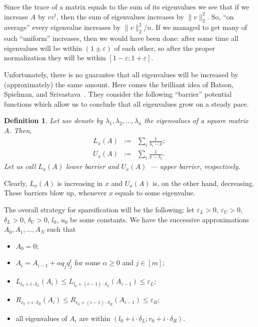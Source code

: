 \documentclass[12pt]{article}
\newcommand{\eps}{\varepsilon}
\newtheorem{definition}{Definition}
\begin{document}
    Since the trace of a matrix equals to the sum of its eigenvalues we see that if
    we increase $A$ by $vv^t$, then the sum of eigenvalues increases by $\|v\|_2^2$.
    So, ``on average'' every eigenvalue increases by $\|v\|_2^2 / n$.
    If we managed to get many of such ``uniform'' increases, then we would have been done:
    after some time all eigenvalues will be within $(1 \pm \eps)$ of each other, so after
    the proper normalization they will be within $[1 - \eps; 1 + \eps]$.

    Unfortunately, there is no guarantee that all eigenvalues will be increased by
    (approximately) the same amount.
    Here comes the brilliant idea of Batson, Spielman, and Srivastava~\cite{BSS09}.
    They consider the following ``barrier'' potential functions which allow us to conclude
    that all eigenvalues grow on a steady pace.

    \begin{definition}
        Let use denote by $\lambda_1, \lambda_2, \ldots, \lambda_n$ the eigenvalues of
        a square matrix $A$. Then,
        \begin{eqnarray*}
            L_{x}(A) &:=& \sum_{i} \frac{1}{\lambda_i - x}; \\
            U_{x}(A) &:=& \sum_{i} \frac{1}{x - \lambda_i}.
        \end{eqnarray*}
        Let us call $L_x(A)$ \emph{lower barrier} and $U_x(A)$~--- upper barrier,
        respectively.
    \end{definition}

    Clearly, $L_x(A)$ is increasing in $x$ and $U_x(A)$ is, on the other hand, decreasing.
    These barriers blow up, whenever $x$ equals to some eigenvalue.

    The overall strategy for sparsification will be the following:
    let $\eps_L > 0$, $\eps_U > 0$, $\delta_L > 0$, $\delta_U > 0$, $l_0$, $u_0$ be some
    constants. We have the successive approximations $A_0, A_1, \ldots, A_N$ such that
    \begin{itemize}
        \item $A_0 = 0$;
        \item $A_i = A_{i-1} + \alpha q_j q_j^t$ for some $\alpha \geq 0$ and $j \in [m]$;
        \item $L_{l_0 + i \cdot \delta_L}(A_i) \leq L_{l_0 +
            (i - 1) \cdot \delta_L}(A_{i-1})
              \leq \eps_L$;
        \item $R_{r_0 + i \cdot \delta_R}(A_i) \leq R_{r_0 +
            (i - 1) \cdot \delta_R}(A_{i-1})
              \leq \eps_R$;
        \item all eigenvalues of $A_i$ are within $(l_0 + i \cdot \delta_L; r_0 + i \cdot
              \delta_R)$.
    \end{itemize}
\end{document}
